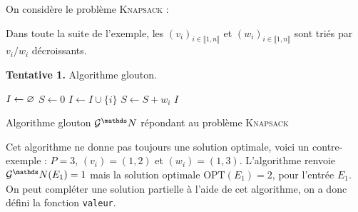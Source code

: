 \begin{exm}
	On considère le problème \textsc{Knapsack} :

	\noindent{}

	\noindent
	Dans toute la suite de l'exemple, les $(v_i)_{i \in \llbracket 1,n \rrbracket}$\/ et $(w_i)_{i \in \llbracket 1,n \rrbracket}$\/ sont triés par $v_i / w_i$\/ décroissants.

	\textbf{Tentative 1.} Algorithme glouton.
	\begin{algorithm}[H]
		\centering
		\begin{algorithmic}[1]
			\State $I \gets \varnothing$\/ 
			\State $S \gets 0$\/ 
			\State $I \gets I \cup \{i\}$\/ 
			\State $S \gets S + w_i$
			\EndIf
			\EndFor
			\State\Return $I$
		\end{algorithmic}
		\caption{Algorithme glouton $\mathcal{G}^\N$ répondant au problème \textsc{Knapsack}}
	\end{algorithm}
	Cet algorithme ne donne pas toujours une solution optimale, voici un contre-exemple : $P = 3$, $(v_i) = (1, 2)$\/ et $(w_i) = (1, 3)$. L'algorithme renvoie $\mathcal{G}^\N(E_1) = 1$\/ mais la solution optimale $\mathrm{OPT}(E_1) = 2$, pour l'entrée $E_1$.
	On peut compléter une solution partielle à l'aide de cet algorithme, on a donc défini la fonction \texttt{valeur}.


\end{exm}
